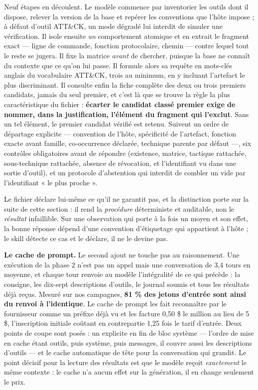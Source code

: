 Neuf étapes en découlent. Le modèle commence par inventorier les outils dont il dispose, relever la version de la base et repérer les conventions que l'hôte impose ; à défaut d'outil ATT\&CK, un mode dégradé lui interdit de simuler une vérification. Il isole ensuite \emph{un} comportement atomique et en extrait le fragment exact --- ligne de commande, fonction protocolaire, chemin --- contre lequel tout le reste se jugera. Il fixe la matrice \emph{avant} de chercher, puisque la base ne connaît du contexte que ce qu'on lui passe. Il formule alors sa requête en mots-clés anglais du vocabulaire ATT\&CK, trois au minimum, en y incluant l'artefact le plus discriminant. Il consulte enfin la fiche complète des deux ou trois premiers candidats, jamais du seul premier, et c'est là que se trouve la règle la plus caractéristique du fichier : \textbf{écarter le candidat classé premier exige de nommer, dans la justification, l'élément du fragment qui l'exclut}. Sans un tel élément, le premier candidat vérifié est retenu. Suivent un ordre de départage explicite --- convention de l'hôte, spécificité de l'artefact, fonction exacte avant famille, co-occurrence déclarée, technique parente par défaut ---, six contrôles obligatoires avant de répondre (existence, matrice, tactique rattachée, sous-technique rattachée, absence de révocation, et l'identifiant vu dans une sortie d'outil), et un protocole d'abstention qui interdit de combler un vide par l'identifiant « le plus proche ».

Le fichier déclare lui-même ce qu'il ne garantit pas, et la distinction porte sur la suite de cette section : il rend la \emph{procédure} déterministe et auditable, non le \emph{résultat} infaillible. Sur une observation qui porte à la fois un moyen et son effet, la bonne réponse dépend d'une convention d'étiquetage qui appartient à l'hôte ; le skill détecte ce cas et le déclare, il ne le devine pas.

\textbf{Le cache de prompt.} Le second ajout ne touche pas au raisonnement. Une exécution de la phase 2 n'est pas un appel mais une conversation de 3,4 tours en moyenne, et chaque tour renvoie au modèle l'intégralité de ce qui précède : la consigne, les dix-sept descriptions d'outils, le journal soumis et tous les résultats déjà reçus. Mesuré sur nos campagnes, \textbf{81 \% des jetons d'entrée sont ainsi du renvoi à l'identique}. Le cache de prompt les fait reconnaître par le fournisseur comme un préfixe déjà vu et les facture 0,50 \$ le million au lieu de 5 \$, l'inscription initiale coûtant en contrepartie 1,25 fois le tarif d'entrée. Deux points de coupe sont posés : un explicite en fin de bloc système --- l'ordre de mise en cache étant outils, puis système, puis messages, il couvre aussi les descriptions d'outils --- et le cache automatique de tête pour la conversation qui grandit. Le point décisif pour la lecture des résultats est que le modèle reçoit \emph{exactement} le même contexte : le cache n'a aucun effet sur la génération, il en change seulement le prix.

